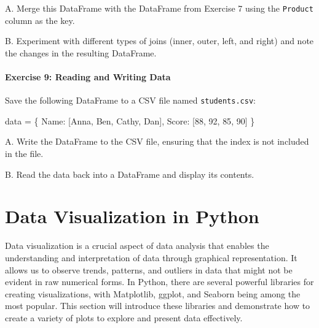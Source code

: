 \documentclass[
  letterpaper,
  DIV=11,
  numbers=noendperiod]{scrreprt}
\newenvironment{Shaded}{\begin{snugshade}}{\end{snugshade}}
\newcommand{\DecValTok}[1]{\textcolor[rgb]{0.68,0.00,0.00}{#1}}
\newcommand{\NormalTok}[1]{\textcolor[rgb]{0.00,0.23,0.31}{#1}}
\newcommand{\OperatorTok}[1]{\textcolor[rgb]{0.37,0.37,0.37}{#1}}
\newcommand{\StringTok}[1]{\textcolor[rgb]{0.13,0.47,0.30}{#1}}
\begin{document}
A. Merge this DataFrame with the DataFrame from Exercise 7 using the
\texttt{Product} column as the key.

B. Experiment with different types of joins (inner, outer, left, and
right) and note the changes in the resulting DataFrame.

\hypertarget{exercise-9-reading-and-writing-data}{%
\subsubsection{Exercise 9: Reading and Writing
Data}\label{exercise-9-reading-and-writing-data}}

Save the following DataFrame to a CSV file named \texttt{students.csv}:

\begin{Shaded}
\begin{Highlighting}[]
\NormalTok{data }\OperatorTok{=}\NormalTok{ \{}
    \StringTok{\textquotesingle{}Name\textquotesingle{}}\NormalTok{: [}\StringTok{\textquotesingle{}Anna\textquotesingle{}}\NormalTok{, }\StringTok{\textquotesingle{}Ben\textquotesingle{}}\NormalTok{, }\StringTok{\textquotesingle{}Cathy\textquotesingle{}}\NormalTok{, }\StringTok{\textquotesingle{}Dan\textquotesingle{}}\NormalTok{],}
    \StringTok{\textquotesingle{}Score\textquotesingle{}}\NormalTok{: [}\DecValTok{88}\NormalTok{, }\DecValTok{92}\NormalTok{, }\DecValTok{85}\NormalTok{, }\DecValTok{90}\NormalTok{]}
\NormalTok{\}}
\end{Highlighting}
\end{Shaded}

A. Write the DataFrame to the CSV file, ensuring that the index is not
included in the file.

B. Read the data back into a DataFrame and display its contents.


\hypertarget{sec-datavis}{%
\chapter{Data Visualization in Python}\label{sec-datavis}}

Data visualization is a crucial aspect of data analysis that enables the
understanding and interpretation of data through graphical
representation. It allows us to observe trends, patterns, and outliers
in data that might not be evident in raw numerical forms. In Python,
there are several powerful libraries for creating visualizations, with
Matplotlib, ggplot, and Seaborn being among the most popular. This
section will introduce these libraries and demonstrate how to create a
variety of plots to explore and present data effectively.
\end{document}

